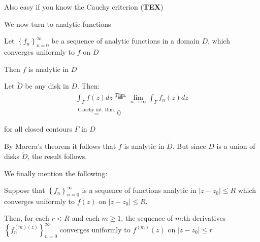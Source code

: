 \par\bigskip
\noindent Also easy if you know the Cauchy criterion (\textbf{TEX})
\par\bigskip
\noindent We now turn to analytic functions
\par\bigskip
\begin{theo}[]{}
  Let $\left\{f_n\right\}_{n=0}^{\infty}$ be a sequence of analytic functions in a domain $D$, which converges uniformly to $f$ on $D$
  \par\bigskip
  \noindent Then $f$ is analytic in $D$
\end{theo}
\par\bigskip
\begin{prf}[]{}
  Let $\tilde{D}$ be any disk in $D$. Then:
  \begin{equation*}
    \begin{gathered}
      \int_{\Gamma}f(z)dz\stackrel{\text{Thm.}}{=}\lim_{n\to\infty}\int_{\Gamma}f_n(z)dz\\
      \stackrel{\text{Cauchy int. thm.}}{=} 0
    \end{gathered}
  \end{equation*}\par
  \noindent for all closed contours $\Gamma$ in $D$
  \par\bigskip
  \noindent By Morera's theorem it follows that $f$ is analytic in $\tilde{D}$. But since $D$ is a union of disks $\tilde{D}$, the result follows.
\end{prf}
\par\bigskip
\noindent We finally mention the following:
\par\bigskip
\begin{theo}[]{}
  Suppose that $\left\{f_n\right\}_{n=0}^{\infty}$ is a sequence of functions analytic in $\left|z-z_0\right|\leq R$ which converges uniformly to $f(z)$ on $\left|z-z_0\right|\leq R$.
  \par\bigskip
  \noindent Then, for each $r<R$ and each $m\geq1$, the sequence of $m$:th derivatives $\left\{f_n^{(m)(z)}\right\}_{n=0}^{\infty}$ converges uniformly to $f^{(m)}(z)$ on $\left|z-z_0\right|\leq r$
\end{theo}
\newpage
